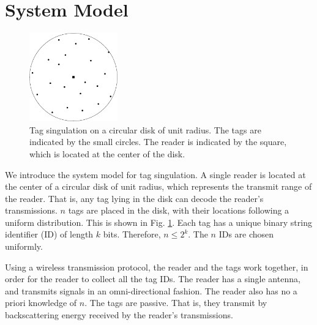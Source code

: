 \documentclass[conference]{IEEEtran}
\begin{document}
\section{System Model}
\label{sec:model}
\begin{figure}
\centering
\includegraphics[width=1.5in]{fig1.eps}
\caption{Tag singulation on a circular disk of unit radius.  The tags are indicated by the small circles.  The reader is indicated by the square, which is located at the center of the disk.\label{fig:fig1}}
\end{figure}
We introduce the system model for tag singulation.  A single reader is located at the center of a circular disk of unit radius, which represents the transmit range of the reader.  That is, any tag lying in the disk can decode the reader's transmissions.  $n$ tags are placed in the disk, with their locations following a uniform distribution.  This is shown in Fig. \ref{fig:fig1}.  Each tag has a unique binary string identifier (ID) of length $k$ bits.  Therefore, $n \leq 2^k$.  The $n$ IDs are chosen uniformly.

Using a wireless transmission protocol, the reader and the tags work together, in order for the reader to collect all the tag IDs.  The reader has a single antenna, and transmits signals in an omni-directional fashion.  The reader also has no a priori knowledge of $n$.  The tags are passive.  That is, they transmit by backscattering energy received by the reader's transmissions.
\end{document}
